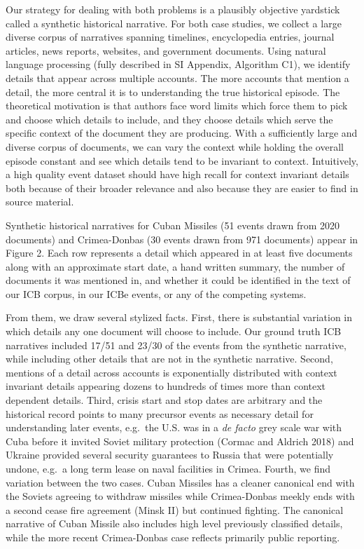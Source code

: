 \documentclass{article}
\begin{document}
Our strategy for dealing with both problems is a plausibly objective
yardstick called a synthetic historical narrative. For both case
studies, we collect a large diverse corpus of narratives spanning
timelines, encyclopedia entries, journal articles, news reports,
websites, and government documents. Using natural language processing
(fully described in SI Appendix, Algorithm C1), we identify details that
appear across multiple accounts. The more accounts that mention a
detail, the more central it is to understanding the true historical
episode. The theoretical motivation is that authors face word limits
which force them to pick and choose which details to include, and they
choose details which serve the specific context of the document they are
producing. With a sufficiently large and diverse corpus of documents, we
can vary the context while holding the overall episode constant and see
which details tend to be invariant to context. Intuitively, a high
quality event dataset should have high recall for context invariant
details both because of their broader relevance and also because they
are easier to find in source material.

Synthetic historical narratives for Cuban Missiles (51 events drawn from
2020 documents) and Crimea-Donbas (30 events drawn from 971 documents)
appear in Figure 2. Each row represents a detail which appeared in at
least five documents along with an approximate start date, a hand
written summary, the number of documents it was mentioned in, and
whether it could be identified in the text of our ICB corpus, in our
ICBe events, or any of the competing systems.

From them, we draw several stylized facts. First, there is substantial
variation in which details any one document will choose to include. Our
ground truth ICB narratives included 17/51 and 23/30 of the events from
the synthetic narrative, while including other details that are not in
the synthetic narrative. Second, mentions of a detail across accounts is
exponentially distributed with context invariant details appearing
dozens to hundreds of times more than context dependent details. Third,
crisis start and stop dates are arbitrary and the historical record
points to many precursor events as necessary detail for understanding
later events, e.g.~the U.S. was in a \textit{de facto} grey scale war
with Cuba before it invited Soviet military protection (Cormac and
Aldrich 2018) and Ukraine provided several security guarantees to Russia
that were potentially undone, e.g.~a long term lease on naval facilities
in Crimea. Fourth, we find variation between the two cases. Cuban
Missiles has a cleaner canonical end with the Soviets agreeing to
withdraw missiles while Crimea-Donbas meekly ends with a second cease
fire agreement (Minsk II) but continued fighting. The canonical
narrative of Cuban Missile also includes high level previously
classified details, while the more recent Crimea-Donbas case reflects
primarily public reporting.
\end{document}
